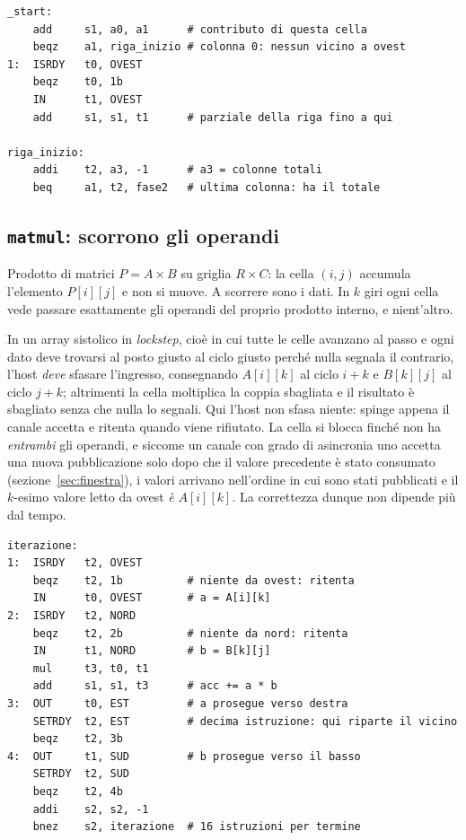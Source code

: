 \begin{lstlisting}[caption={La prima fase di \texttt{reduce.s}: il salto sulla posizione},label={lst:reduce},language=RISCV,float=htbp]
_start:
    add     s1, a0, a1      # contributo di questa cella
    beqz    a1, riga_inizio # colonna 0: nessun vicino a ovest
1:  ISRDY   t0, OVEST
    beqz    t0, 1b
    IN      t1, OVEST
    add     s1, s1, t1      # parziale della riga fino a qui

riga_inizio:
    addi    t2, a3, -1      # a3 = colonne totali
    beq     a1, t2, fase2   # ultima colonna: ha il totale
\end{lstlisting}

\subsection{\texttt{matmul}: scorrono gli operandi}
\label{sec:kernel-matmul}

Prodotto di matrici $P = A \times B$ su griglia $R \times C$: la cella $(i,j)$
accumula l'elemento $P[i][j]$ e non si muove. A scorrere sono i dati.
In $k$ giri ogni cella vede passare esattamente gli operandi del proprio
prodotto interno, e nient'altro.


In un array sistolico in \emph{lockstep}, cioè in cui tutte le celle avanzano al
passo e ogni dato deve trovarsi al posto giusto al ciclo giusto perché nulla
segnala il contrario, l'host \emph{deve} sfasare l'ingresso, consegnando $A[i][k]$
al ciclo $i+k$ e $B[k][j]$ al ciclo $j+k$; altrimenti la cella moltiplica la
coppia sbagliata e il risultato è sbagliato senza che nulla lo segnali. Qui
l'host non sfasa niente: spinge appena il canale accetta e ritenta quando
viene rifiutato. La cella si blocca finché non ha \emph{entrambi} gli operandi,
e siccome un canale con grado di asincronia uno accetta una nuova pubblicazione solo dopo
che il valore precedente è stato consumato (sezione~\ref{sec:finestra}), i
valori arrivano nell'ordine in cui sono stati pubblicati e il $k$-esimo valore
letto da ovest \emph{è} $A[i][k]$. La correttezza dunque non dipende più dal tempo.

\begin{lstlisting}[caption={Un giro di \texttt{matmul.s}: i due operandi si aspettano a vicenda},label={lst:matmul},language=RISCV,float=htbp]
iterazione:
1:  ISRDY   t2, OVEST
    beqz    t2, 1b          # niente da ovest: ritenta
    IN      t0, OVEST       # a = A[i][k]
2:  ISRDY   t2, NORD
    beqz    t2, 2b          # niente da nord: ritenta
    IN      t1, NORD        # b = B[k][j]
    mul     t3, t0, t1
    add     s1, s1, t3      # acc += a * b
3:  OUT     t0, EST         # a prosegue verso destra
    SETRDY  t2, EST         # decima istruzione: qui riparte il vicino
    beqz    t2, 3b
4:  OUT     t1, SUD         # b prosegue verso il basso
    SETRDY  t2, SUD
    beqz    t2, 4b
    addi    s2, s2, -1
    bnez    s2, iterazione  # 16 istruzioni per termine
\end{lstlisting}

